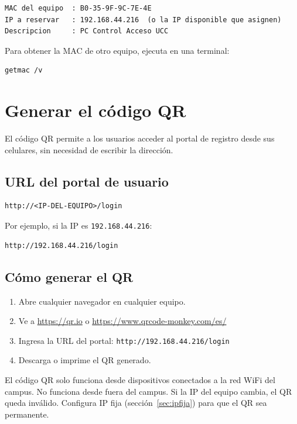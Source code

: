 \documentclass[12pt, a4paper]{article}
\begin{document}
\begin{lstlisting}
MAC del equipo  : B0-35-9F-9C-7E-4E
IP a reservar   : 192.168.44.216  (o la IP disponible que asignen)
Descripcion     : PC Control Acceso UCC
\end{lstlisting}

Para obtener la MAC de otro equipo, ejecuta en una terminal:
\begin{lstlisting}
getmac /v
\end{lstlisting}

\section{Generar el código QR}

El código QR permite a los usuarios acceder al portal de registro
desde sus celulares, sin necesidad de escribir la dirección.

\subsection{URL del portal de usuario}

\begin{lstlisting}
http://<IP-DEL-EQUIPO>/login
\end{lstlisting}

Por ejemplo, si la IP es \texttt{192.168.44.216}:
\begin{lstlisting}
http://192.168.44.216/login
\end{lstlisting}

\subsection{Cómo generar el QR}

\begin{enumerate}
  \item Abre cualquier navegador en cualquier equipo.
  \item Ve a \url{https://qr.io} o \url{https://www.qrcode-monkey.com/es/}
  \item Ingresa la URL del portal: \texttt{http://192.168.44.216/login}
  \item Descarga o imprime el QR generado.
\end{enumerate}

\begin{importante}
  El código QR solo funciona desde dispositivos conectados a la red
  WiFi del campus. No funciona desde fuera del campus.
  Si la IP del equipo cambia, el QR queda inválido. Configura IP fija
  (sección~\ref{sec:ipfija}) para que el QR sea permanente.
\end{importante}
\end{document}
